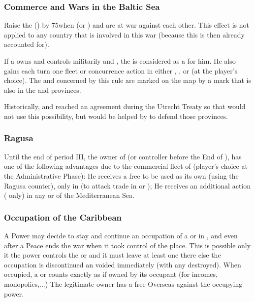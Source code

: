 \subsubsection{Commerce and Wars in the Baltic Sea}
\aparag Raise the  () by
75\ducats when \SUE (or ) and  are at war against
each other.
\aparag This effect is not applied to any country that is involved in this war
(because this is then already accounted for).

\aparag If a \MAJ owns and controls militarily  and
, the  is considered as a \CTZ for him.
\bparag He also gains each turn one fleet or concurrence action in either
, ,  or  (at the player's
choice).  \bparag The \CTZ and \STZ concerned by this rule are marked on the
map by a mark that is also in the  and 
provinces.
\begin{designnote}
  Historically, \SPA and \HOL reached an agreement during the Utrecht Treaty
  so that \SPA would not use this possibility, but would be helped by \HOL to
  defend those provinces.
\end{designnote}


\subsubsection{Ragusa}\label{chSpecific:Ragusa}
\aparag Until the end of period III, the owner of  (or
controller before the End of ), has one of the
following advantages due to the commercial fleet of  (player's
choice at the Administrative Phase):
\bparag He receives a free \corsaire\facemoins to be used as its own (using
the Ragusa counter), only in  (to attack trade in
 or );
\bparag He receives an additional action
( only) in any \STZ or \CTZ of the Mediterranean Sea.


\subsubsection{Occupation of the
  Caribbean}\label{chSpecific:Occupation:Caribbean}
\aparag A Power may decide to stay and continue an occupation of a \COL or \TP
in , and even after a Peace ends the war when it took
control of the place. This is possible only it the power controls the \COL or
\TP and it must leave at least one \LD there else the occupation is
discontinued an voided immediately (with any \de destroyed).
\bparag When occupied, a \TP or \COL counts exactly as if owned by its
occupant (for incomes, monopolies,...)
\bparag The legitimate owner has a free Overseas \CB against the occupying
power.


